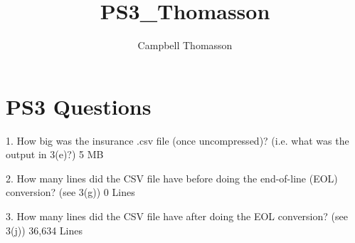 \documentclass{article}
\title{PS3_Thomasson}
\author{Campbell Thomasson}
\begin{document}
\maketitle

\section{PS3 Questions}

1. How big was the insurance .csv file (once uncompressed)? (i.e. what was the
output in 3(e)?) 5 MB

2. How many lines did the CSV file have before doing the end-of-line (EOL) conversion? (see 3(g)) 0 Lines

3. How many lines did the CSV file have after doing the EOL conversion? (see 3(j)) 36,634 Lines
\end{document}
